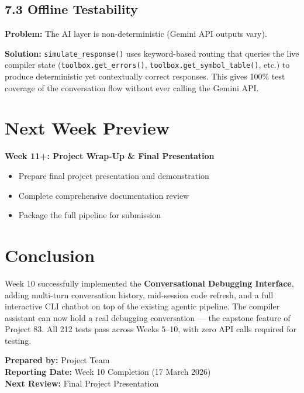 \documentclass[a4paper,11pt]{article}
\begin{document}
\subsection{7.3 Offline Testability}
\textbf{Problem:} The AI layer is non-deterministic (Gemini API outputs vary).

\textbf{Solution:} \texttt{simulate\_response()} uses keyword-based routing that queries the live compiler state (\texttt{toolbox.get\_errors()}, \texttt{toolbox.get\_symbol\_table()}, etc.) to produce deterministic yet contextually correct responses. This gives 100\% test coverage of the conversation flow without ever calling the Gemini API.

\section{Next Week Preview}

\textbf{Week 11+: Project Wrap-Up \& Final Presentation}

\begin{itemize}[leftmargin=*]
    \item Prepare final project presentation and demonstration
    \item Complete comprehensive documentation review
    \item Package the full pipeline for submission
\end{itemize}

\section{Conclusion}

Week 10 successfully implemented the \textbf{Conversational Debugging Interface}, adding multi-turn conversation history, mid-session code refresh, and a full interactive CLI chatbot on top of the existing agentic pipeline. The compiler assistant can now hold a real debugging conversation --- the capstone feature of Project 83. All 212 tests pass across Weeks 5--10, with zero API calls required for testing.

\vspace{5mm}
\noindent\textbf{Prepared by:} Project Team \\
\textbf{Reporting Date:} Week 10 Completion (17 March 2026) \\
\textbf{Next Review:} Final Project Presentation
\end{document}
